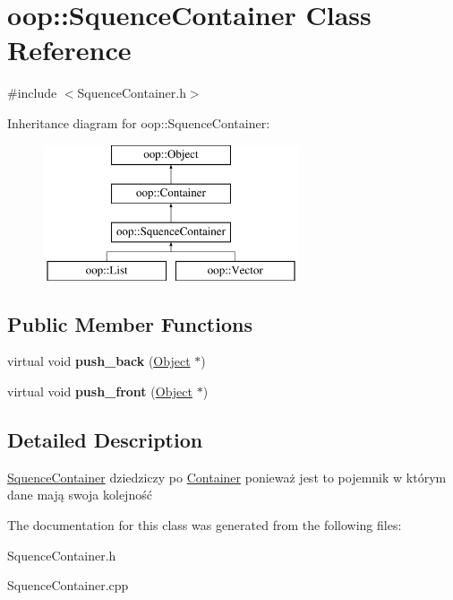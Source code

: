 \hypertarget{classoop_1_1SquenceContainer}{\section{oop\-:\-:\-Squence\-Container \-Class \-Reference}
\label{classoop_1_1SquenceContainer}
}


{\ttfamily \#include $<$\-Squence\-Container.\-h$>$}

\-Inheritance diagram for oop\-:\-:\-Squence\-Container\-:\begin{figure}[H]
\begin{center}
\leavevmode
\includegraphics[height=4.000000cm]{classoop_1_1SquenceContainer}
\end{center}
\end{figure}
\subsection*{\-Public \-Member \-Functions}
\begin{DoxyCompactItemize}
\item 
\hypertarget{classoop_1_1SquenceContainer_a2106fdced5444a932f21a7400a864a3c}{virtual void {\bfseries push\-\_\-back} (\hyperlink{classoop_1_1Object}{\-Object} $\ast$)}\label{classoop_1_1SquenceContainer_a2106fdced5444a932f21a7400a864a3c}

\item 
\hypertarget{classoop_1_1SquenceContainer_ae40b6c7f54dbf7568f16cec7d2f11b6c}{virtual void {\bfseries push\-\_\-front} (\hyperlink{classoop_1_1Object}{\-Object} $\ast$)}\label{classoop_1_1SquenceContainer_ae40b6c7f54dbf7568f16cec7d2f11b6c}

\end{DoxyCompactItemize}


\subsection{\-Detailed \-Description}
\hyperlink{classoop_1_1SquenceContainer}{\-Squence\-Container} dziedziczy po \hyperlink{classoop_1_1Container}{\-Container} ponieważ jest to pojemnik w którym dane mają swoja kolejność 

\-The documentation for this class was generated from the following files\-:\begin{DoxyCompactItemize}
\item 
\-Squence\-Container.\-h\item 
\-Squence\-Container.\-cpp\end{DoxyCompactItemize}
